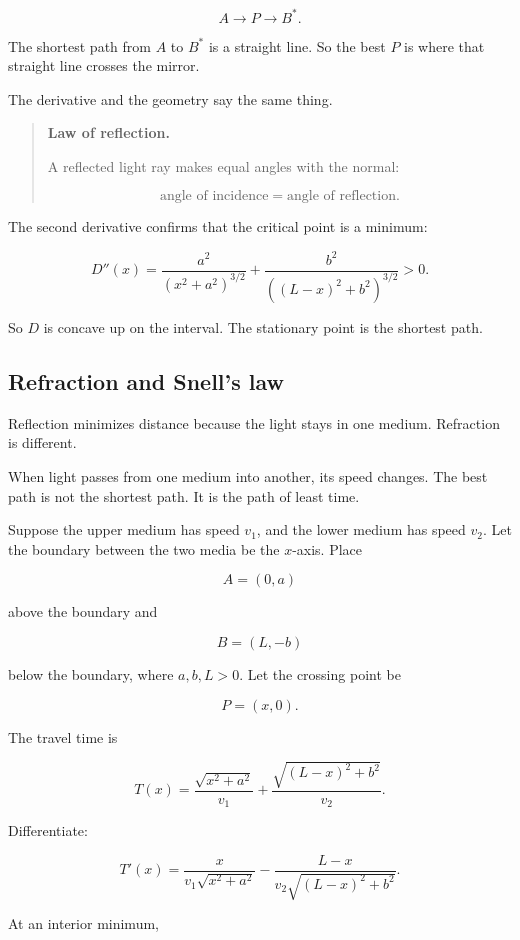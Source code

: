 \[
A\to P\to B^*.
\]

The shortest path from \(A\) to \(B^*\) is a straight line.  So the best \(P\) is where
that straight line crosses the mirror.

The derivative and the geometry say the same thing.

\begin{quote}
\textbf{Law of reflection.}

A reflected light ray makes equal angles with the normal:

\[
\boxed{
\text{angle of incidence}=\text{angle of reflection}.
}
\]
\end{quote}

The second derivative confirms that the critical point is a minimum:

\[
D''(x)
=
\frac{a^2}{(x^2+a^2)^{3/2}}
+
\frac{b^2}{((L-x)^2+b^2)^{3/2}}
>0.
\]

So \(D\) is concave up on the interval.  The stationary point is the shortest path.

\subsection{Refraction and Snell's law}
\label{subsec:refraction-snells-law}

Reflection minimizes distance because the light stays in one medium.  Refraction is
different.

When light passes from one medium into another, its speed changes.  The best path is
not the shortest path.  It is the path of least time.

Suppose the upper medium has speed \(v_1\), and the lower medium has speed \(v_2\).
Let the boundary between the two media be the \(x\)-axis.  Place

\[
A=(0,a)
\]

above the boundary and

\[
B=(L,-b)
\]

below the boundary, where \(a,b,L>0\).  Let the crossing point be

\[
P=(x,0).
\]

The travel time is

\[
T(x)
=
\frac{\sqrt{x^2+a^2}}{v_1}
+
\frac{\sqrt{(L-x)^2+b^2}}{v_2}.
\]

Differentiate:

\[
T'(x)
=
\frac{x}{v_1\sqrt{x^2+a^2}}
-
\frac{L-x}{v_2\sqrt{(L-x)^2+b^2}}.
\]

At an interior minimum,


